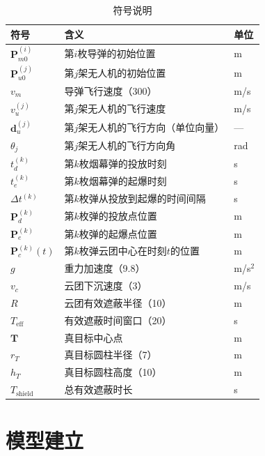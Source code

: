 \documentclass[12pt,a4paper]{article}
\newcommand{\vect}[1]{\boldsymbol{#1}}
\begin{document}
\begin{table}[H]
    \centering
    \caption{符号说明}
    \label{tab:symbols}
    \begin{tabular}{lll}
        \toprule
        符号 & 含义 & 单位 \\
        \midrule
        $\vect{P}_{m0}^{(i)}$ & 第$i$枚导弹的初始位置 & m \\
        $\vect{P}_{u0}^{(j)}$ & 第$j$架无人机的初始位置 & m \\
        $v_m$ & 导弹飞行速度（300） & m/s \\
        $v_u^{(j)}$ & 第$j$架无人机的飞行速度 & m/s \\
        $\vect{d}_u^{(j)}$ & 第$j$架无人机的飞行方向（单位向量） & --- \\
        $\theta_j$ & 第$j$架无人机的飞行方向角 & rad \\
        $t_d^{(k)}$ & 第$k$枚烟幕弹的投放时刻 & s \\
        $t_e^{(k)}$ & 第$k$枚烟幕弹的起爆时刻 & s \\
        $\Delta t^{(k)}$ & 第$k$枚弹从投放到起爆的时间间隔 & s \\
        $\vect{P}_d^{(k)}$ & 第$k$枚弹的投放点位置 & m \\
        $\vect{P}_e^{(k)}$ & 第$k$枚弹的起爆点位置 & m \\
        $\vect{P}_c^{(k)}(t)$ & 第$k$枚弹云团中心在时刻$t$的位置 & m \\
        $g$ & 重力加速度（9.8） & m/s$^2$ \\
        $v_c$ & 云团下沉速度（3） & m/s \\
        $R$ & 云团有效遮蔽半径（10） & m \\
        $T_{\text{eff}}$ & 有效遮蔽时间窗口（20） & s \\
        $\vect{T}$ & 真目标中心点 & m \\
        $r_T$ & 真目标圆柱半径（7） & m \\
        $h_T$ & 真目标圆柱高度（10） & m \\
        $T_{\text{shield}}$ & 总有效遮蔽时长 & s \\
        \bottomrule
    \end{tabular}
\end{table}


\section{模型建立}
\end{document}
